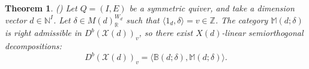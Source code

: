 \documentclass [11pt,oneside,a4paper,mathscr]{amsart}
\newtheorem{thm}{Theorem}[section]
\theoremstyle{definition}
\newcommand{\X}{\mathscr{X}}
\begin{document}
\begin{thm}\label{theorem266}\emph{(\cite{P})}
Let $Q=(I, E)$ be a symmetric quiver, 
and take a dimension vector $d\in \mathbb{N}^I$. 
Let $\delta\in M(d)^{W_d}_\mathbb{R}$ 
such that $\langle 1_d, \delta\rangle=v \in \mathbb{Z}$.
The category $\mathbb{M}(d; \delta)$ is right admissible in $D^b(\X(d))_v$,
so there exist $X(d)$-linear semiorthogonal decompositions:
\begin{equation}\label{SODtheorem266}
D^b(\X(d))_v=\langle \mathbb{B}(d;\delta), \mathbb{M}(d; \delta) \rangle. 
\end{equation}

\end{thm}
\end{document}
